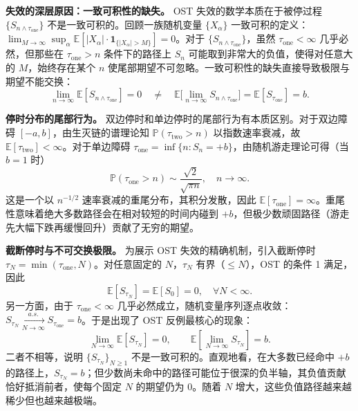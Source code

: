 \textbf{失效的深层原因：一致可积性的缺失。} OST 失效的数学本质在于被停过程 $\{S_{n \wedge \tau_{\text{one}}}\}$ 不是一致可积的\cite{chow1997probability}。回顾一族随机变量 $\{X_\alpha\}$ 一致可积的定义：$\lim_{M \to \infty} \sup_{\alpha} \mathbb{E}[|X_\alpha| \cdot \mathbf{1}_{\{|X_\alpha| > M\}}] = 0$。对于 $\{S_{n \wedge \tau_{\text{one}}}\}$，虽然 $\tau_{\text{one}} < \infty$ 几乎必然，但那些在 $\tau_{\text{one}} > n$ 条件下的路径上 $S_n$ 可能取到非常大的负值，使得对任意大的 $M$，始终存在某个 $n$ 使尾部期望不可忽略。一致可积性的缺失直接导致极限与期望不能交换：
\begin{equation}
  \lim_{n \to \infty} \mathbb{E}[S_{n \wedge \tau_{\text{one}}}] = 0 \quad \neq \quad
  \mathbb{E}\Big[\lim_{n \to \infty} S_{n \wedge \tau_{\text{one}}}\Big] = \mathbb{E}[S_{\tau_{\text{one}}}] = b.
\end{equation}

\textbf{停时分布的尾部行为。} 双边停时和单边停时的尾部行为有本质区别。对于双边障碍 $[-a, b]$，由生灭链的谱理论知 $\mathbb{P}(\tau_{\text{two}} > n)$ 以指数速率衰减，故 $\mathbb{E}[\tau_{\text{two}}] < \infty$。对于单边障碍 $\tau_{\text{one}} = \inf\{n: S_n = +b\}$，由随机游走理论可得（当 $b = 1$ 时）\cite{feller1968introduction}
\begin{equation}\label{eq:tail_heavy}
  \mathbb{P}(\tau_{\text{one}} > n) \sim \frac{\sqrt{2}}{\sqrt{\pi n}}, \quad n \to \infty.
\end{equation}
这是一个以 $n^{-1/2}$ 速率衰减的重尾分布，其积分发散，因此 $\mathbb{E}[\tau_{\text{one}}] = \infty$。重尾性意味着绝大多数路径会在相对较短的时间内碰到 $+b$，但极少数顽固路径（游走先大幅下跌再缓慢回升）贡献了无穷的期望。

\textbf{截断停时与不可交换极限。} 为展示 OST 失效的精确机制，引入截断停时 $\tau_N = \min(\tau_{\text{one}}, N)$。对任意固定的 $N$，$\tau_N$ 有界（$\leqslant N$），OST 的条件 1 满足，因此
\begin{equation}\label{eq:trunc_ost}
  \mathbb{E}[S_{\tau_N}] = \mathbb{E}[S_0] = 0, \quad \forall N < \infty.
\end{equation}
另一方面，由于 $\tau_{\text{one}} < \infty$ 几乎必然成立，随机变量序列逐点收敛：$S_{\tau_N} \xrightarrow[N\to\infty]{a.s.} S_{\tau_{\text{one}}}=b$。于是出现了 OST 反例最核心的现象：
\begin{equation}\label{eq:no_ui_limit}
  \lim_{N\to\infty}\mathbb{E}[S_{\tau_N}] = 0,
  \qquad
  \mathbb{E}\!\left[\lim_{N\to\infty}S_{\tau_N}\right] = b.
\end{equation}
二者不相等，说明 $\{S_{\tau_N}\}_{N\geqslant 1}$ 不是一致可积的。直观地看，在大多数已经命中 $+b$ 的路径上，$S_{\tau_N}=b$；但少数尚未命中的路径可能位于很深的负半轴，其负值贡献恰好抵消前者，使每个固定 $N$ 的期望仍为 0。随着 $N$ 增大，这些负值路径越来越稀少但也越来越极端。

